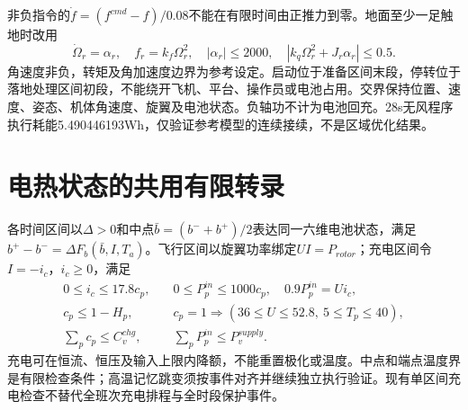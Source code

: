 非负指令的$\dot f=(f^{cmd}-f)/0.08$不能在有限时间由正推力到零。地面至少一足触地时改用
\begin{equation}
\dot\Omega_r=\alpha_r,\quad f_r=k_f\Omega_r^2,\quad
|\alpha_r|\le2000,\quad |k_q\Omega_r^2+J_r\alpha_r|\le0.5.
\end{equation}
角速度非负，转矩及角加速度边界为参考设定。启动位于准备区间末段，停转位于落地处理区间初段，不能绕开飞机、平台、操作员或电池占用。交界保持位置、速度、姿态、机体角速度、旋翼及电池状态。负轴功不计为电池回充。28s无风程序执行耗能5.490446193Wh，仅验证参考模型的连续接续，不是区域优化结果。

\section{电热状态的共用有限转录}
各时间区间以$\Delta>0$和中点$\bar b=(b^-+b^+)/2$表达同一六维电池状态，满足$b^+-b^-=\Delta F_b(\bar b,I,T_a)$。飞行区间以旋翼功率绑定$UI=P_{rotor}$；充电区间令$I=-i_c$，$i_c\ge0$，满足
\begin{align}
0\le i_c\le17.8c_p,&\quad0\le P_p^{in}\le1000c_p,\quad0.9P_p^{in}=Ui_c,\\
c_p\le1-H_p,&\quad c_p=1\Rightarrow(36\le U\le52.8,\ 5\le T_p\le40),\\
\sum_pc_p\le C_v^{chg},&\quad\sum_pP_p^{in}\le P_v^{supply}.
\end{align}
充电可在恒流、恒压及输入上限内降额，不能重置极化或温度。中点和端点温度界是有限检查条件；高温记忆跳变须按事件对齐并继续独立执行验证。现有单区间充电检查不替代全班次充电排程与全时段保护事件。
